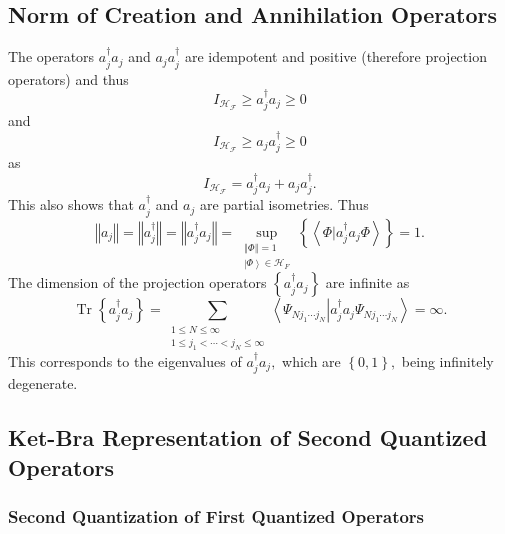 \documentclass[aps,preprint]{revtex4}%
\begin{document}
\subsection{Norm of Creation and Annihilation Operators}

The operators $a_{j}^{\dagger}a_{j}$ and $a_{j}a_{j}^{\dagger}$ are idempotent
and positive (therefore projection operators) and thus
\begin{equation}
I_{\mathcal{H}_{\mathcal{F}}}\geq a_{j}^{\dagger}a_{j}\geq0
\end{equation}
and
\begin{equation}
I_{\mathcal{H}_{\mathcal{F}}}\geq a_{j}a_{j}^{\dagger}\geq0
\end{equation}
as
\begin{equation}
I_{\mathcal{H}_{\mathcal{F}}}=a_{j}^{\dagger}a_{j}+a_{j}a_{j}^{\dagger}.
\end{equation}
This also shows that $a_{j}^{\dagger}$ and $a_{j}$ are partial isometries.
Thus
\begin{equation}
\left\Vert a_{j}\right\Vert =\left\Vert a_{j}^{\dagger}\right\Vert =\left\Vert
a_{j}^{\dagger}a_{j}\right\Vert =\sup_{\substack{\left\Vert \Phi\right\Vert
=1\\\left\vert \Phi\right\rangle \in\mathcal{H}_{F}}}\left\{  \left\langle
\left.  \Phi\right\vert a_{j}^{\dagger}a_{j}\Phi\right\rangle \right\}  =1.
\label{OccOpNorm}%
\end{equation}
The dimension of the projection operators $\left\{  a_{j}^{\dagger}%
a_{j}\right\}  $ are infinite as
\begin{equation}
\operatorname*{Tr}\left\{  a_{j}^{\dagger}a_{j}\right\}  =\sum
_{\substack{1\leq N\leq\infty\\1\leq j_{1}<\cdots<j_{N}\leq\infty
}}\left\langle \Psi_{Nj_{1}\cdots j_{N}}\left\vert a_{j}^{\dagger}a_{j}%
\Psi_{Nj_{1}\cdots j_{N}}\right.  \right\rangle =\infty.
\end{equation}
This corresponds to the eigenvalues of $a_{j}^{\dagger}a_{j},$ which are
$\left\{  0,1\right\}  ,$ being infinitely degenerate.

\subsection{Ket-Bra Representation of Second Quantized Operators}

\subsubsection{Second Quantization of First Quantized Operators}
\end{document}
